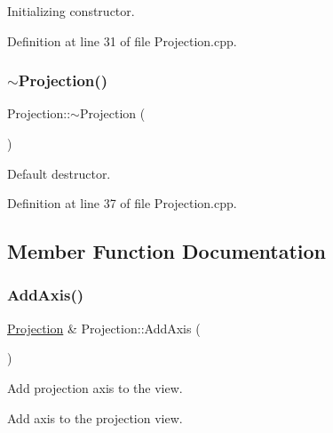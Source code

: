 Initializing constructor. 



Definition at line 31 of file Projection.\+cpp.

\hypertarget{class_d_d4hep_1_1_projection_ac0554f994078308f0169a4629a2d1b0a}{}\label{class_d_d4hep_1_1_projection_ac0554f994078308f0169a4629a2d1b0a} 
\subsubsection{\texorpdfstring{$\sim$\+Projection()}{~Projection()}}
{\footnotesize\ttfamily Projection\+::$\sim$\+Projection (\begin{DoxyParamCaption}{ }\end{DoxyParamCaption})\hspace{0.3cm}{\ttfamily [virtual]}}



Default destructor. 



Definition at line 37 of file Projection.\+cpp.



\subsection{Member Function Documentation}
\hypertarget{class_d_d4hep_1_1_projection_a06d9f151c2e689580f04967905bd97b8}{}\label{class_d_d4hep_1_1_projection_a06d9f151c2e689580f04967905bd97b8} 
\subsubsection{\texorpdfstring{Add\+Axis()}{AddAxis()}}
{\footnotesize\ttfamily \hyperlink{class_d_d4hep_1_1_projection}{Projection} \& Projection\+::\+Add\+Axis (\begin{DoxyParamCaption}{ }\end{DoxyParamCaption})\hspace{0.3cm}{\ttfamily [virtual]}}



Add projection axis to the view. 

Add axis to the projection view. 

